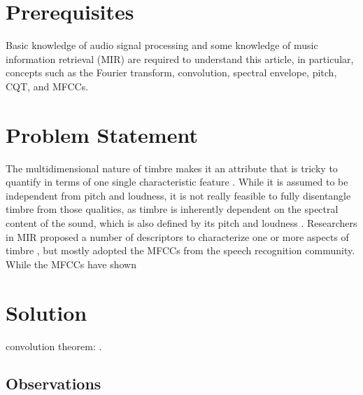 \documentclass[journal]{IEEEtran}
\begin{document}
\section{Prerequisites}

Basic knowledge of audio signal processing and some knowledge of music information retrieval (MIR) are required to understand this article, in particular, concepts such as the Fourier transform, convolution, spectral envelope, pitch, CQT, and MFCCs.


\section{Problem Statement}

The multidimensional nature of timbre makes it an attribute that is tricky to quantify in terms of one single characteristic feature \cite{grey1977}. While it is assumed to be independent from pitch and loudness, it is not really feasible to fully disentangle timbre from those qualities, as timbre is inherently dependent on the spectral content of the sound, which is also defined by its pitch and loudness \cite{moore2004}. Researchers in MIR proposed a number of descriptors to characterize one or more aspects of timbre \cite{peeters2003}, but mostly adopted the MFCCs from the speech recognition community. While the MFCCs have shown 

%

\cite{engel2017}


\section{Solution}


convolution theorem: \cite{proakis1995}.

\subsection{Observations}
\end{document}
